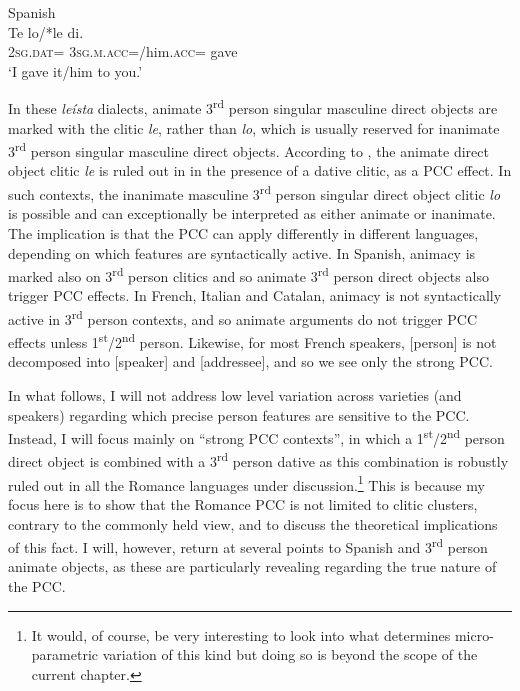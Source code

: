 \documentclass[output=paper,colorlinks,citecolor=brown,nonflat]{langsci/langscibook}
\begin{document}
\ea%
    \label{ex:sheehan:8}
    Spanish \citep[321]{OrmazabalRomero2007}\\
    \gll    Te     lo/*le     di.  \\
            \textsc{2sg}.\textsc{dat}=  \textsc{3sg.m.acc}=/him.\textsc{acc}=  gave\\
    \glt    ‘I gave it/him to you.’
\z

In these \textit{leísta} dialects, animate 3\textsuperscript{rd} person singular masculine direct objects are marked with the clitic \textit{le}, rather than \textit{lo}, which is usually reserved for inanimate 3\textsuperscript{rd} person singular masculine direct objects. According to \citeauthor{OrmazabalRomero2007}, the animate direct object clitic \textit{le} is ruled out in  in the presence of a dative clitic, as a PCC effect. In such contexts, the inanimate masculine 3\textsuperscript{rd} person singular direct object clitic \textit{lo} is possible and can exceptionally be interpreted as either animate or inanimate. The implication is that the PCC can apply differently in different languages, depending on which features are syntactically active. In Spanish, animacy is marked also on 3\textsuperscript{rd} person clitics and so animate 3\textsuperscript{rd} person direct objects also trigger PCC effects. In French, Italian and Catalan, animacy is not syntactically active in 3\textsuperscript{rd} person contexts, and so animate arguments do not trigger PCC effects unless 1\textsuperscript{st}/2\textsuperscript{nd} person. Likewise, for most French speakers, [person] is not decomposed into [speaker] and [addressee], and so we see only the strong PCC.

In what follows, I will not address low level variation across varieties (and speakers) regarding which precise person features are sensitive to the PCC. Instead, I will focus mainly on ``strong PCC contexts'', in which a 1\textsuperscript{st}/2\textsuperscript{nd} person direct object is combined with a 3\textsuperscript{rd} person dative as this combination is robustly ruled out in all the Romance languages under discussion.\footnote{It would, of course, be very interesting to look into what determines micro-parametric variation of this kind but doing so is beyond the scope of the current chapter.}  This is because my focus here is to show that the Romance PCC is not limited to clitic clusters, contrary to the commonly held view, and to discuss the theoretical implications of this fact. I will, however, return at several points to Spanish and 3\textsuperscript{rd} person animate objects, as these are particularly revealing regarding the true nature of the PCC.
\end{document}
